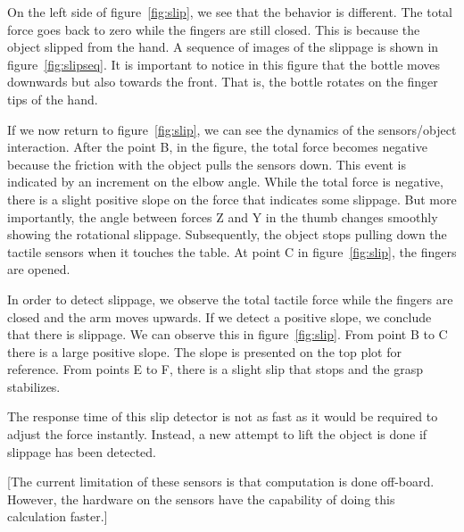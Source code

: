 On the left side of figure~\ref{fig:slip}, we see that the
behavior is different. The total force goes back to zero while the
fingers are still closed. This is because the object slipped from
the hand. A sequence of images of the slippage is shown in
figure~\ref{fig:slipseq}. It is important to notice in this figure
that the bottle moves downwards but also towards the front. That
is, the bottle rotates on the finger tips of the hand.

If we now return to figure~\ref{fig:slip}, we can see the dynamics
of the sensors/object interaction. After the point B, in the
figure, the total force becomes negative because the friction with
the object pulls the sensors down. This event is indicated by an
increment on the elbow angle. While the total force is negative,
there is a slight positive slope on the force that indicates some
slippage. But more importantly, the angle between forces Z and Y
in the thumb changes smoothly showing the rotational slippage.
Subsequently, the object stops pulling down the tactile sensors
when it touches the table. At point C in figure~\ref{fig:slip},
the fingers are opened.


In order to detect slippage, we observe the total tactile force
while the fingers are closed and the arm moves upwards. If we
detect a positive slope, we conclude that there is slippage. We
can observe this in figure~\ref{fig:slip}. From point B to C there
is a large positive slope. The slope is presented on the top plot
for reference. From points E to F, there is a slight slip that
stops and the grasp stabilizes.

The response time of this slip detector is not as fast as it would
be required to adjust the force instantly. Instead, a new attempt
to lift the object is done if slippage has been detected.

[The current limitation of these sensors is that computation is
done off-board. However, the hardware on the sensors have the
capability of doing this calculation faster.]


